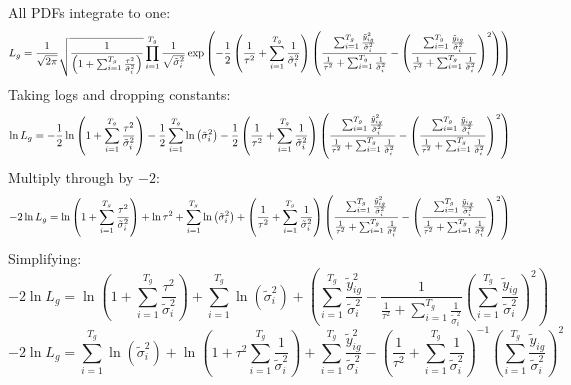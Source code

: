 \documentclass[12pt]{article}
\begin{document}
All PDFs integrate to one:%
\[
L_{g}=\frac{1}{\sqrt{2\pi }}\sqrt{\frac{1}{\left( 1+\sum_{i=1}^{T_{g}}\frac{%
\tau ^{2}}{\tilde{\sigma}_{i}^{2}}\right) }}\prod_{i=1}^{T_{g}}\frac{1}{%
\sqrt{\tilde{\sigma}_{i}^{2}}}\exp \left( -\frac{1}{2}\left( \frac{1}{\tau
^{2}}+\sum_{i=1}^{T_{g}}\frac{1}{\tilde{\sigma}_{i}^{2}}\right) \left( \frac{%
\sum_{i=1}^{T_{g}}\frac{\tilde{y}_{ig}^{2}}{\tilde{\sigma}_{i}^{2}}}{\frac{1%
}{\tau ^{2}}+\sum_{i=1}^{T_{g}}\frac{1}{\tilde{\sigma}_{i}^{2}}}-\left( 
\frac{\sum_{i=1}^{T_{g}}\frac{\tilde{y}_{ig}}{\tilde{\sigma}_{i}^{2}}}{\frac{%
1}{\tau ^{2}}+\sum_{i=1}^{T_{g}}\frac{1}{\tilde{\sigma}_{i}^{2}}}\right)
^{2}\right) \right) 
\]%
Taking logs and dropping constants:%
\[
\ln L_{g}=-\frac{1}{2}\ln \left( 1+\sum_{i=1}^{T_{g}}\frac{\tau ^{2}}{\tilde{%
\sigma}_{i}^{2}}\right) -\frac{1}{2}\sum_{i=1}^{T_{g}}\ln \left( \tilde{%
\sigma}_{i}^{2}\right) -\frac{1}{2}\left( \frac{1}{\tau ^{2}}%
+\sum_{i=1}^{T_{g}}\frac{1}{\tilde{\sigma}_{i}^{2}}\right) \left( \frac{%
\sum_{i=1}^{T_{g}}\frac{\tilde{y}_{ig}^{2}}{\tilde{\sigma}_{i}^{2}}}{\frac{1%
}{\tau ^{2}}+\sum_{i=1}^{T_{g}}\frac{1}{\tilde{\sigma}_{i}^{2}}}-\left( 
\frac{\sum_{i=1}^{T_{g}}\frac{\tilde{y}_{ig}}{\tilde{\sigma}_{i}^{2}}}{\frac{%
1}{\tau ^{2}}+\sum_{i=1}^{T_{g}}\frac{1}{\tilde{\sigma}_{i}^{2}}}\right)
^{2}\right) 
\]%
Multiply through by $-2$:%
\[
-2\ln L_{g}=\ln \left( 1+\sum_{i=1}^{T_{g}}\frac{\tau ^{2}}{\tilde{\sigma}%
_{i}^{2}}\right) +\ln \tau ^{2}+\sum_{i=1}^{T_{g}}\ln \left( \tilde{\sigma}%
_{i}^{2}\right) +\left( \frac{1}{\tau ^{2}}+\sum_{i=1}^{T_{g}}\frac{1}{%
\tilde{\sigma}_{i}^{2}}\right) \left( \frac{\sum_{i=1}^{T_{g}}\frac{\tilde{y}%
_{ig}^{2}}{\tilde{\sigma}_{i}^{2}}}{\frac{1}{\tau ^{2}}+\sum_{i=1}^{T_{g}}%
\frac{1}{\tilde{\sigma}_{i}^{2}}}-\left( \frac{\sum_{i=1}^{T_{g}}\frac{%
\tilde{y}_{ig}}{\tilde{\sigma}_{i}^{2}}}{\frac{1}{\tau ^{2}}%
+\sum_{i=1}^{T_{g}}\frac{1}{\tilde{\sigma}_{i}^{2}}}\right) ^{2}\right) 
\]%
Simplifying:%
\[
-2\ln L_{g}=\ln \left( 1+\sum_{i=1}^{T_{g}}\frac{\tau ^{2}}{\tilde{\sigma}%
_{i}^{2}}\right) +\sum_{i=1}^{T_{g}}\ln \left( \tilde{\sigma}_{i}^{2}\right)
+\left( \sum_{i=1}^{T_{g}}\frac{\tilde{y}_{ig}^{2}}{\tilde{\sigma}_{i}^{2}}-%
\frac{1}{\frac{1}{\tau ^{2}}+\sum_{i=1}^{T_{g}}\frac{1}{\tilde{\sigma}%
_{i}^{2}}}\left( \sum_{i=1}^{T_{g}}\frac{\tilde{y}_{ig}}{\tilde{\sigma}%
_{i}^{2}}\right) ^{2}\right) 
\]%
\[
-2\ln L_{g}=\sum_{i=1}^{T_{g}}\ln \left( \tilde{\sigma}_{i}^{2}\right) +\ln
\left( 1+\tau ^{2}\sum_{i=1}^{T_{g}}\frac{1}{\tilde{\sigma}_{i}^{2}}\right)
+\sum_{i=1}^{T_{g}}\frac{\tilde{y}_{ig}^{2}}{\tilde{\sigma}_{i}^{2}}-\left( 
\frac{1}{\tau ^{2}}+\sum_{i=1}^{T_{g}}\frac{1}{\tilde{\sigma}_{i}^{2}}%
\right) ^{-1}\left( \sum_{i=1}^{T_{g}}\frac{\tilde{y}_{ig}}{\tilde{\sigma}%
_{i}^{2}}\right) ^{2} 
\]
\end{document}
